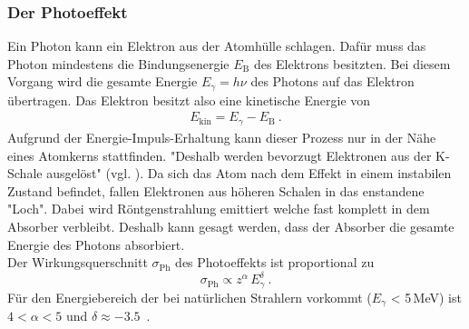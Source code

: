 \subsubsection{Der Photoeffekt}
Ein Photon kann ein Elektron aus der Atomhülle schlagen. Dafür muss das Photon mindestens die Bindungsenergie $E_\text{B}$ des Elektrons besitzten. Bei diesem Vorgang wird die gesamte Energie $E_\gamma = h\nu$ des Photons auf das Elektron übertragen. Das Elektron besitzt also eine kinetische Energie von
\begin{align}
	E_\text{kin} = E_\gamma - E_\text{B} \ .
\end{align}
Aufgrund der Energie-Impuls-Erhaltung kann dieser Prozess nur in der Nähe eines Atomkerns stattfinden. "Deshalb werden bevorzugt Elektronen aus der K-Schale ausgelöst" (vgl. \cite[3]{V18}). Da sich das Atom nach dem Effekt in einem instabilen Zustand befindet, fallen Elektronen aus höheren Schalen in das enstandene "Loch". Dabei wird Röntgenstrahlung emittiert welche fast komplett in dem Absorber verbleibt. Deshalb kann gesagt werden, dass der Absorber die gesamte Energie des Photons absorbiert. \\
Der Wirkungsquerschnitt $\sigma_\text{Ph}$ des Photoeffekts ist proportional zu
\begin{equation}
	\sigma_\text{Ph} \propto z^{\alpha}\,E_\gamma^{\delta} \ .
\end{equation}
Für den Energiebereich der bei natürlichen Strahlern vorkommt ($E_\gamma$ < 5\,MeV) ist $4 < \alpha < 5$ und $\delta \approx -3.5$\ .



